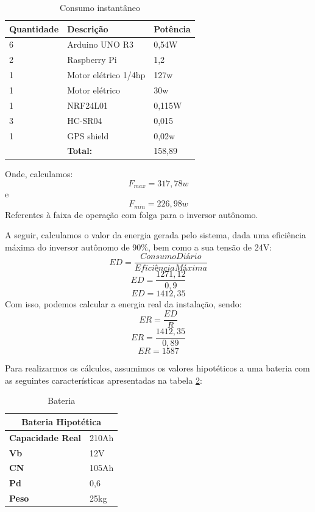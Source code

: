 \begin{table}[]
\centering
\caption{Consumo instantâneo}
\label{cap:proposta:tab:instantaneo}
\begin{tabular}{l|l|l|}
\hline
\multicolumn{1}{|l|}{\textbf{Quantidade}} & \textbf{Descrição}   & \textbf{Potência} \\ \hline
\multicolumn{1}{|l|}{6}                   & Arduino UNO R3       & 0,54W             \\ \hline
\multicolumn{1}{|l|}{2}                   & Raspberry Pi         & 1,2               \\ \hline
\multicolumn{1}{|l|}{1}                   & Motor elétrico 1/4hp & 127w             \\ \hline
\multicolumn{1}{|l|}{1}                   & Motor elétrico       & 30w               \\ \hline
\multicolumn{1}{|l|}{1}                   & NRF24L01             & 0,115W            \\ \hline
\multicolumn{1}{|l|}{3}                   & HC-SR04              & 0,015             \\ \hline
\multicolumn{1}{|l|}{1}                   & GPS shield           & 0,02w             \\ \hline
                                          & \textbf{Total:}      & 158,89        \\ \cline{2-3} 
\end{tabular}
\end{table}
Onde, calculamos:
\[F_{max}=317,78w\] e \[F_{min}=226,98w\]
Referentes à faixa de operação com folga para o inversor autônomo. 

A seguir, calculamos o valor da energia gerada pelo sistema, dada uma eficiência máxima do inversor autônomo de 90\%, bem como a sua tensão de 24V:
\[ED =\frac{Consumo Diário}{Eficiência Máxima}\]
\[ED = \frac{1271,12}{0,9}\]
\[ED = 1412,35\]
Com isso, podemos calcular a energia real da instalação, sendo:
\[ER=\frac{ED}{R}\]
\[ER=\frac{1412,35}{0,89}\]
\[ER=1587\]

Para realizarmos os cálculos, assumimos os valores hipotéticos a uma bateria com as seguintes características apresentadas na tabela \ref{cap:proposta:tab:bateria}:
\begin{table}[h]
\centering
\caption{Bateria}
\label{cap:proposta:tab:bateria}
\begin{tabular}{|l|l|}
\hline
\multicolumn{2}{|c|}{\textbf{Bateria Hipotética}} \\ \hline
\textbf{Capacidade Real}          & 210Ah         \\ \hline
\textbf{Vb}                       & 12V           \\ \hline
\textbf{CN}                       & 105Ah         \\ \hline
\textbf{Pd}                       & 0,6           \\ \hline
\textbf{Peso}                     & 25kg           \\ \hline
\end{tabular}
\end{table}

